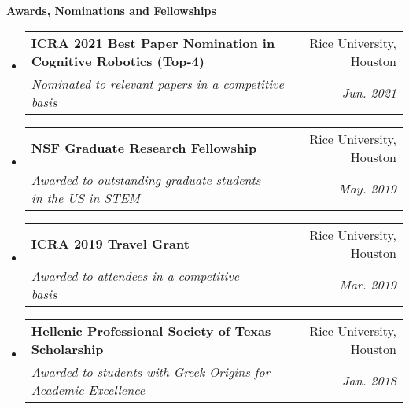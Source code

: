 \documentclass[letterpaper,11pt]{article}
\makeatletter
\newcommand{\resheading}[1]{{\large \colorbox{mygrey}{\begin{minipage}{\textwidth}{\textbf{#1 \vphantom{p\^{E}}}}\end{minipage}}}}
\newcommand{\ressubheading}[4]{
\begin{tabular*}{7.0in}{l@{\extracolsep{\fill}}r}
		\textbf{#1} & #2 \\
		\textit{#3} & \textit{#4} \\
\end{tabular*}\vspace{-6pt}}
\makeatother
\begin{document}
\resheading{Awards, Nominations and Fellowships}
\begin{itemize}
		\item
        \ressubheading{ICRA 2021 Best Paper Nomination in Cognitive Robotics (Top-4)}
        {Rice University, Houston}{Nominated to relevant papers in a competitive basis}
		{Jun. 2021}
		\item
     	\ressubheading{NSF Graduate Research Fellowship}
     	{Rice University, Houston}{Awarded to outstanding graduate students in the US in STEM }{May. 2019}
		\item
		\ressubheading{ICRA 2019 Travel Grant}
		{Rice University, Houston}{Awarded to attendees in a competitive basis }{Mar. 2019}
		\item
		\ressubheading{Hellenic Professional Society of Texas Scholarship}
		{Rice University, Houston}{Awarded to students with Greek Origins for Academic Excellence}
		{Jan. 2018}
\end{itemize}

\pagebreak
\end{document}
